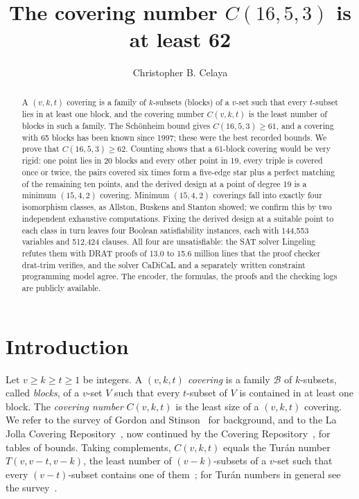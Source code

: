 \documentclass[11pt]{amsart}
\theoremstyle{definition}
\theoremstyle{remark}
\newcommand{\cB}{\mathcal{B}}
\begin{document}
\title{The covering number \texorpdfstring{$C(16,5,3)$}{C(16,5,3)} is at least 62}

\author{Christopher B. Celaya}
\address{Celaya Solutions Research, El Paso, Texas, USA}


\begin{abstract}
A $(v,k,t)$ covering is a family of $k$-subsets (blocks) of a $v$-set such
that every $t$-subset lies in at least one block, and the covering number
$C(v,k,t)$ is the least number of blocks in such a family. The Sch\"onheim
bound gives $C(16,5,3)\ge 61$, and a covering with 65 blocks has been known
since 1997; these were the best recorded bounds. We prove that
$C(16,5,3)\ge 62$. Counting shows that a 61-block covering would be very
rigid: one point lies in 20 blocks and every other point in 19, every triple is
covered once or twice, the pairs covered six times form a five-edge star plus a
perfect matching of the remaining ten points, and the derived design at a point
of degree 19 is a minimum $(15,4,2)$ covering. Minimum $(15,4,2)$ coverings
fall into exactly four isomorphism classes, as Allston, Buskens and Stanton
showed; we confirm this by two independent exhaustive computations. Fixing the
derived design at a suitable point to each class in turn leaves four Boolean
satisfiability instances, each with 144,553 variables and 512,424 clauses. All
four are unsatisfiable: the SAT solver Lingeling refutes them with DRAT
proofs of 13.0 to 15.6 million lines that the proof checker drat-trim
verifies, and the solver CaDiCaL and a separately written constraint
programming model agree. The encoder, the
formulas, the proofs and the checking logs are publicly available.
\end{abstract}

\maketitle

\section{Introduction}\label{sec:intro}

Let $v\ge k\ge t\ge 1$ be integers. A \emph{$(v,k,t)$ covering} is a family
$\cB$ of $k$-subsets, called \emph{blocks}, of a $v$-set $V$ such that every
$t$-subset of $V$ is contained in at least one block. The \emph{covering
number} $C(v,k,t)$ is the least size of a $(v,k,t)$ covering. We refer to the
survey of Gordon and Stinson~\cite{handbook} for background, and to the La
Jolla Covering Repository~\cite{ljcr}, now continued by the Covering
Repository~\cite{coveringrepo}, for tables of bounds. Taking complements,
$C(v,k,t)$ equals the Tur\'an number $T(v,v-t,v-k)$, the least number of
$(v-k)$-subsets of a $v$-set such that every $(v-t)$-subset contains one of
them~\cite{gordon1995,handbook}; for Tur\'an numbers in general see the
survey~\cite{sidorenko1995}.
\end{document}
